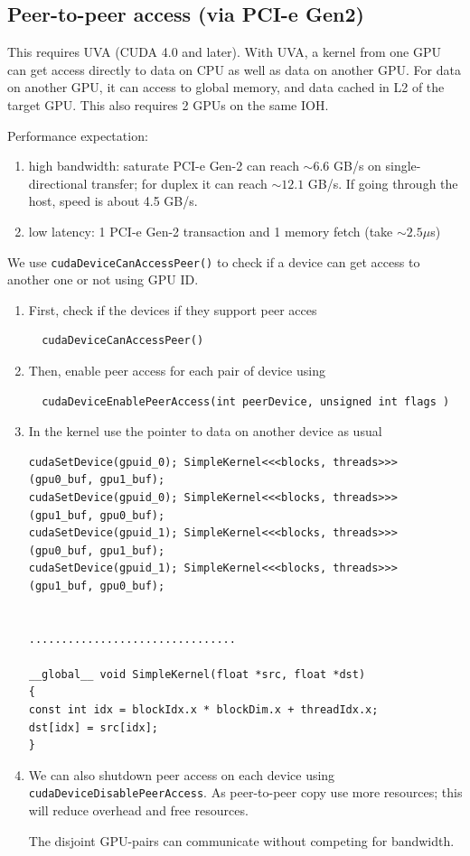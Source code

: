 \subsection{Peer-to-peer access (via PCI-e Gen2)}
\label{sec:CUDA4_peer2peer-access}

This requires UVA (CUDA 4.0 and later). 
With UVA, a kernel from one GPU can get access directly to data on CPU as well
as data on another GPU. For data on another GPU, it can access to global memory,
and data cached in L2 of the target GPU. This also requires 2 GPUs on the same
IOH. 

\begin{framed}
Performance expectation: 
\begin{enumerate}
  \item high bandwidth: saturate PCI-e Gen-2 can reach $\sim 6.6$ GB/s on
  single-directional transfer; for duplex it can reach $\sim 12.1$ GB/s. If
  going through the host, speed is about 4.5 GB/s.
  \item low latency: 1 PCI-e Gen-2 transaction and 1 memory fetch (take
  $\sim 2.5\mu$s)
\end{enumerate}
\end{framed}

We use \verb!cudaDeviceCanAccessPeer()! to check if a
device can get access to another one or not using GPU ID. 
\begin{enumerate}
  \item First, check if the devices if they support peer acces
  \begin{lstlisting}
  cudaDeviceCanAccessPeer()
  \end{lstlisting}
  
  \item Then, enable peer access for each pair of device using 
  \begin{lstlisting}
  cudaDeviceEnablePeerAccess(int peerDevice, unsigned int flags )
  \end{lstlisting}

\item In the kernel use the pointer to data on another device as usual
\begin{lstlisting}
cudaSetDevice(gpuid_0); SimpleKernel<<<blocks, threads>>> (gpu0_buf, gpu1_buf);
cudaSetDevice(gpuid_0); SimpleKernel<<<blocks, threads>>> (gpu1_buf, gpu0_buf);
cudaSetDevice(gpuid_1); SimpleKernel<<<blocks, threads>>> (gpu0_buf, gpu1_buf);
cudaSetDevice(gpuid_1); SimpleKernel<<<blocks, threads>>> (gpu1_buf, gpu0_buf);


................................

__global__ void SimpleKernel(float *src, float *dst)
{
const int idx = blockIdx.x * blockDim.x + threadIdx.x;
dst[idx] = src[idx];
}
\end{lstlisting}

\item We can also shutdown peer access on each device using
\verb!cudaDeviceDisablePeerAccess!. As peer-to-peer copy use more resources;
this will reduce overhead and free resources. 

The disjoint GPU-pairs can communicate without competing for bandwidth.
\end{enumerate}


